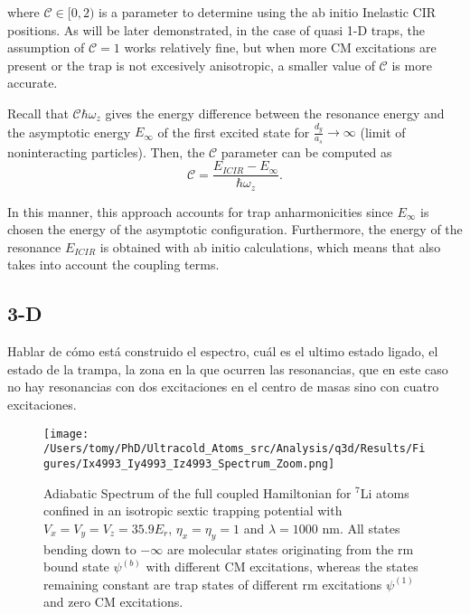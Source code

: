 \documentclass[aps,pre,twocolumn,superscriptaddress,showpacs]{revtex4-1}
\begin{document}
	where $\mathcal{C} \in [0, 2)$ is a parameter to determine using the ab initio Inelastic CIR positions. As will be later demonstrated, in the case of quasi 1-D traps, the assumption of $\mathcal{C}=1$ works relatively fine, but when more CM excitations are present or the trap is not excesively anisotropic, a smaller value of $\mathcal{C}$ is more accurate.
	
	Recall that $\mathcal{C} \hbar \omega_z$ gives the energy difference between the resonance energy and the asymptotic energy $E_{\infty}$ of the first excited state for $\frac{d_y}{a_s} \to \infty$ (limit of noninteracting particles). Then, the $\mathcal{C}$ parameter can be computed as
	\begin{equation}
		\mathcal{C} = \frac{E_{ICIR} - E_{\infty}}{\hbar \omega_z}.
	\end{equation}
	
	In this manner, this approach accounts for trap anharmonicities since $E_{\infty}$ is chosen the energy of the asymptotic configuration. Furthermore, the energy of the resonance $E_{ICIR}$ is obtained with ab initio calculations, which means that also takes into account the coupling terms.    

\subsection{3-D} \label{subsec:3D}
Hablar de cómo está construido el espectro, cuál es el ultimo estado ligado, el estado de la trampa, la zona en la que ocurren las resonancias, que en este caso no hay resonancias con dos excitaciones en el centro de masas sino con cuatro excitaciones.

	\begin{widetext}
	\begin{figure*}[htbp!]
   	 \centering
    	\texttt{[image: /Users/tomy/PhD/Ultracold\_Atoms\_src/Analysis/q3d/Results/Figures/Ix4993\_Iy4993\_Iz4993\_Spectrum\_Zoom.png]}
	\caption{Adiabatic Spectrum of the full coupled Hamiltonian for $^7$Li atoms confined in an isotropic sextic trapping potential with $V_x = V_y = V_z = 35.9E_r$, $\eta_x = \eta_y = 1$ and $\lambda=1000$ nm. All states bending down to $-\infty$ are molecular states originating from the rm bound state $\psi^{(b)}$ with different CM excitations, whereas the states remaining constant are trap states of different rm excitations $\psi^{(1)}$ and zero CM excitations.}
    	\label{fig:3D spectrum}
	\end{figure*}
	\end{widetext}
		
\end{document}
